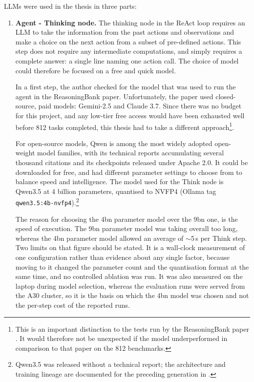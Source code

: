 LLMs were used in the thesis in three parts:
\begin{enumerate}
    \item \textbf{Agent - Thinking node.} The thinking node in the ReAct loop
    requires an LLM to take the information from the past actions and
    observations and make a choice on the next action from a subset of
    pre-defined actions. This step does not require any intermediate
    computations, and simply requires a complete answer: a single line naming
    one action call. The choice of model could therefore be focused on a free
    and quick model.

    In a first step, the author checked for the model that was used to run the
    agent in the ReasoningBank paper. Unfortunately, the paper used
    closed-source, paid models: Gemini-2.5 and Claude 3.7. Since there was no
    budget for this project, and any low-tier free access would have been
    exhausted well before 812 tasks completed, this thesis had to take a
    different approach\footnote{This is an important distinction to the tests
    run by the ReasoningBank paper \citep{ouyang2025reasoningbank}. It would
    therefore not be unexpected if the model underperformed in comparison to
    that paper on the 812 benchmarks.}.

    For open-source models, Qwen is among the most widely adopted open-weight
    model families, with its technical reports accumulating several thousand
    citations \citep{yang2024qwen25, yang2025qwen3} and its checkpoints
    released under Apache 2.0. It could be downloaded for free, and had
    different parameter settings to choose from to balance speed and
    intelligence. The model used for the Think node is Qwen3.5 at 4 billion
    parameters, quantised to NVFP4 (Ollama tag
    \texttt{qwen3.5:4b-nvfp4}).\footnote{Qwen3.5 was released without a
    technical report; the architecture and training lineage are documented for
    the preceding generation in \citet{yang2025qwen3}.}

    The reason for choosing the 4bn parameter model over the 9bn one, is the
    speed of execution. The 9bn parameter model was taking overall too long,
    whereas the 4bn parameter model allowed an average of $\sim$5\,s per Think
    step. Two limits on that figure should be stated. It is a wall-clock
    measurement of one configuration rather than evidence about any single
    factor, because moving to it changed the parameter count and the
    quantisation format at the same time, and no controlled ablation was run.
    It was also measured on the laptop during model selection, whereas the
    evaluation runs were served from the A30 cluster, so it is the basis on
    which the 4bn model was chosen and not the per-step cost of the reported
    runs.


\end{enumerate}
